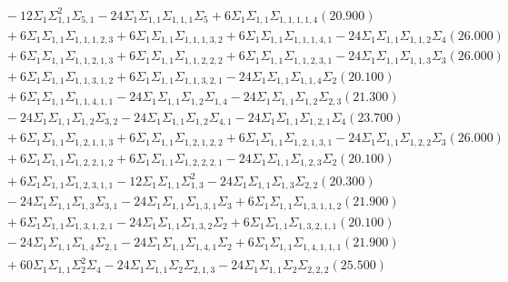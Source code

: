 \documentclass[12pt]{article}
\begin{document}
\begin{landscape}
\begin{align*}
		&\quad\quad -12\Sigma_{1}\Sigma_{1,1}^{2}\Sigma_{5,1}-24\Sigma_{1}\Sigma_{1,1}\Sigma_{1,1,1}\Sigma_{5}+6\Sigma_{1}\Sigma_{1,1}\Sigma_{1,1,1,1,4}(20.900) \\ 
		&\quad\quad +6\Sigma_{1}\Sigma_{1,1}\Sigma_{1,1,1,2,3}+6\Sigma_{1}\Sigma_{1,1}\Sigma_{1,1,1,3,2}+6\Sigma_{1}\Sigma_{1,1}\Sigma_{1,1,1,4,1}-24\Sigma_{1}\Sigma_{1,1}\Sigma_{1,1,2}\Sigma_{4}(26.000) \\ 
		&\quad\quad +6\Sigma_{1}\Sigma_{1,1}\Sigma_{1,1,2,1,3}+6\Sigma_{1}\Sigma_{1,1}\Sigma_{1,1,2,2,2}+6\Sigma_{1}\Sigma_{1,1}\Sigma_{1,1,2,3,1}-24\Sigma_{1}\Sigma_{1,1}\Sigma_{1,1,3}\Sigma_{3}(26.000) \\ 
		&\quad\quad +6\Sigma_{1}\Sigma_{1,1}\Sigma_{1,1,3,1,2}+6\Sigma_{1}\Sigma_{1,1}\Sigma_{1,1,3,2,1}-24\Sigma_{1}\Sigma_{1,1}\Sigma_{1,1,4}\Sigma_{2}(20.100) \\ 
		&\quad\quad +6\Sigma_{1}\Sigma_{1,1}\Sigma_{1,1,4,1,1}-24\Sigma_{1}\Sigma_{1,1}\Sigma_{1,2}\Sigma_{1,4}-24\Sigma_{1}\Sigma_{1,1}\Sigma_{1,2}\Sigma_{2,3}(21.300) \\ 
		&\quad\quad -24\Sigma_{1}\Sigma_{1,1}\Sigma_{1,2}\Sigma_{3,2}-24\Sigma_{1}\Sigma_{1,1}\Sigma_{1,2}\Sigma_{4,1}-24\Sigma_{1}\Sigma_{1,1}\Sigma_{1,2,1}\Sigma_{4}(23.700) \\ 
		&\quad\quad +6\Sigma_{1}\Sigma_{1,1}\Sigma_{1,2,1,1,3}+6\Sigma_{1}\Sigma_{1,1}\Sigma_{1,2,1,2,2}+6\Sigma_{1}\Sigma_{1,1}\Sigma_{1,2,1,3,1}-24\Sigma_{1}\Sigma_{1,1}\Sigma_{1,2,2}\Sigma_{3}(26.000) \\ 
		&\quad\quad +6\Sigma_{1}\Sigma_{1,1}\Sigma_{1,2,2,1,2}+6\Sigma_{1}\Sigma_{1,1}\Sigma_{1,2,2,2,1}-24\Sigma_{1}\Sigma_{1,1}\Sigma_{1,2,3}\Sigma_{2}(20.100) \\ 
		&\quad\quad +6\Sigma_{1}\Sigma_{1,1}\Sigma_{1,2,3,1,1}-12\Sigma_{1}\Sigma_{1,1}\Sigma_{1,3}^{2}-24\Sigma_{1}\Sigma_{1,1}\Sigma_{1,3}\Sigma_{2,2}(20.300) \\ 
		&\quad\quad -24\Sigma_{1}\Sigma_{1,1}\Sigma_{1,3}\Sigma_{3,1}-24\Sigma_{1}\Sigma_{1,1}\Sigma_{1,3,1}\Sigma_{3}+6\Sigma_{1}\Sigma_{1,1}\Sigma_{1,3,1,1,2}(21.900) \\ 
		&\quad\quad +6\Sigma_{1}\Sigma_{1,1}\Sigma_{1,3,1,2,1}-24\Sigma_{1}\Sigma_{1,1}\Sigma_{1,3,2}\Sigma_{2}+6\Sigma_{1}\Sigma_{1,1}\Sigma_{1,3,2,1,1}(20.100) \\ 
		&\quad\quad -24\Sigma_{1}\Sigma_{1,1}\Sigma_{1,4}\Sigma_{2,1}-24\Sigma_{1}\Sigma_{1,1}\Sigma_{1,4,1}\Sigma_{2}+6\Sigma_{1}\Sigma_{1,1}\Sigma_{1,4,1,1,1}(21.900) \\ 
		&\quad\quad +60\Sigma_{1}\Sigma_{1,1}\Sigma_{2}^{2}\Sigma_{4}-24\Sigma_{1}\Sigma_{1,1}\Sigma_{2}\Sigma_{2,1,3}-24\Sigma_{1}\Sigma_{1,1}\Sigma_{2}\Sigma_{2,2,2}(25.500) \\ 

\end{align*}
\end{landscape}
\end{document}
